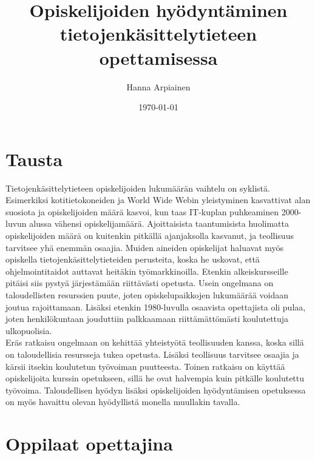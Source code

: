 \documentclass[finnish]{tktltiki2}
\title{﻿Opiskelijoiden hyödyntäminen tietojenkäsittelytieteen opettamisessa}
\author{Hanna Arpiainen}
\date{\today}
\theoremstyle{definition}
\theoremstyle{remark}
\begin{document}
\maketitle
\makeabstract

\tableofcontents
\newpage






\section{Tausta}
Tietojenkäsittelytieteen opiskelijoiden lukumäärän vaihtelu on syklistä.\cite{Roberts11} Esimerkiksi kotitietokoneiden ja World Wide Webin yleistyminen kasvattivat alan suosiota ja opiskelijoiden määrä kasvoi, kun taas IT-kuplan puhkeaminen 2000-luvun alussa vähensi opiskelijamäärä. Ajoittaisista taantumisista huolimatta opiskelijoiden määrä on kuitenkin pitkällä ajanjaksolla kasvanut, ja teollisuus tarvitsee yhä enemmän osaajia. Muiden aineiden opiskelijat haluavat myös opiskella tietojenkäsittelytieteiden perusteita, koska he uskovat, että ohjelmointitaidot auttavat heitäkin työmarkkinoilla. Etenkin alkeiskursseille pitäisi siis pystyä järjestämään riittävästi opetusta. 
Usein ongelmana on taloudellisten resurssien puute, joten opiskelupaikkojen lukumäärää voidaan joutua rajoittamaan. Lisäksi etenkin 1980-luvulla osaavista opettajista oli pulaa, joten henkilökuntaan jouduttiin palkkaamaan riittämättömästi koulutettuja ulkopuolisia.
\\
Eräs ratkaisu ongelmaan on kehittää yhteistyötä teollisuuden kanssa, koska sillä on taloudellisia resursseja tukea opetusta. Lisäksi teollisuus tarvitsee osaajia ja kärsii itsekin koulutetun työvoiman puutteesta. Toinen ratkaisu on käyttää opiskelijoita kurssin opetukseen, sillä he ovat halvempia kuin pitkälle koulutettu työvoima. Taloudellisen hyödyn lisäksi opiskelijoiden hyödyntämisen opetuksessa on myös havaittu olevan hyödyllistä monella muullakin tavalla.




\section{Oppilaat opettajina}
\end{document}
